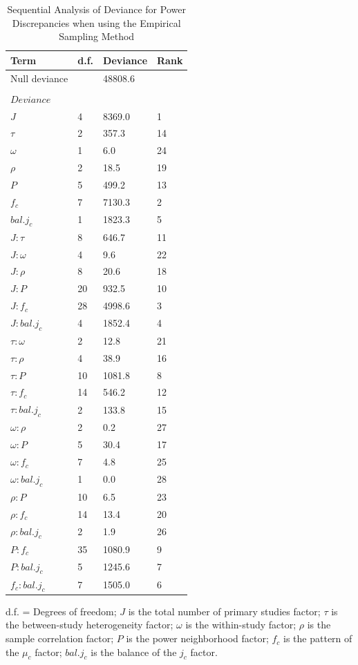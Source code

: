 \begin{table}[H]
\caption{Sequential Analysis of Deviance for Power Discrepancies when using the Empirical Sampling Method}
     \label{tab:SequentialAnalysis}
    \centering
    \begin{tabular}{p{3cm}p{3cm}p{3cm}p{3cm}}
        \toprule
    Term & d.f. & Deviance & Rank \\ \midrule
       Null deviance & & 48808.6 & \\
        &&&\\
       $Deviance$ & & & \\
       $J$ & 4 & 8369.0 & 1 \\
       $\tau$ & 2 & 357.3 & 14  \\ 
       $\omega$ & 1 & 6.0 & 24 \\
       $\rho$ & 2 & 18.5 & 19 \\
       $P$ & 5 & 499.2 & 13 \\
       $f_c$ & 7 & 7130.3 & 2 \\
       $bal. j_c$ & 1 & 1823.3 & 5 \\
       $J:\tau$ & 8 & 646.7 & 11  \\ 
       $J:\omega$ & 4 & 9.6 & 22 \\
       $J:\rho$ & 8 & 20.6 & 18 \\
       $J:P$ & 20 & 932.5 & 10 \\
       $J:f_c$ & 28 & 4998.6 & 3 \\
       $J:bal. j_c$ & 4 & 1852.4 & 4 \\
       $\tau:\omega$ & 2 & 12.8 & 21 \\
       $\tau:\rho$ & 4 & 38.9 & 16 \\
       $\tau:P$ & 10 & 1081.8 & 8 \\
       $\tau:f_c$ & 14 & 546.2 & 12 \\
       $\tau:bal. j_c$ & 2 & 133.8 & 15 \\
       $\omega:\rho$ & 2 & 0.2 & 27 \\
       $\omega:P$ & 5 & 30.4 & 17 \\
       $\omega:f_c$ & 7 & 4.8 & 25 \\
       $\omega:bal. j_c$ & 1 & 0.0 & 28 \\
       $\rho:P$ & 10 & 6.5 & 23 \\
       $\rho:f_c$ & 14 & 13.4 & 20 \\
       $\rho:bal. j_c$ & 2 & 1.9 & 26 \\ 
       $P:f_c$ & 35 & 1080.9 & 9 \\
       $P:bal. j_c$ & 5 & 1245.6 & 7 \\
       $f_c:bal. j_c$ & 7 & 1505.0 & 6 \\
        \bottomrule
    \end{tabular}
   
    \small
      d.f. = Degrees of freedom; $J$ is the total number of primary studies factor; $\tau$ is the between-study heterogeneity factor; $\omega$ is the within-study factor; $\rho$ is the sample correlation factor; $P$ is the power neighborhood factor; $f_c$ is the pattern of the $\mu_c$ factor; $bal. j_c$ is the balance of the $j_c$ factor. 
\end{table}



